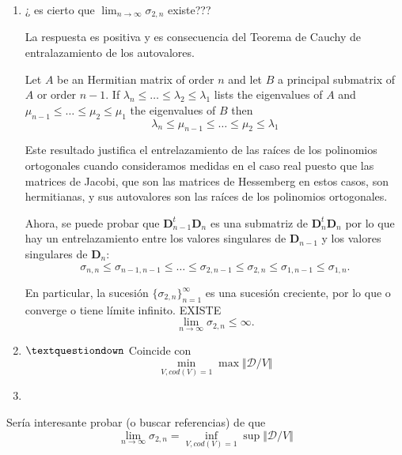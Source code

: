 \documentclass[12pt,a4paper]{article}
\begin{document}
\begin{enumerate} 
\item ¿ es cierto que $\lim_{n\to \infty} \sigma_{2,n}$ existe??? 

\noindent La respuesta es positiva y es consecuencia del Teorema de Cauchy de entralazamiento de los autovalores. 

 Let $A$ be an Hermitian matrix of order $n$ and let $B$ a principal submatrix of $A$ or order $n-1$. If $\lambda_n\leq \dots \leq \lambda_2\leq \lambda_1$ lists the eigenvalues of $A$ and $\mu_{n-1}\leq \dots \leq \mu_2\leq \mu_1$ the eigenvalues of $B$ then 
$$
\lambda_n \leq \mu_{n-1} \leq \dots \leq \mu_2 \leq \lambda_1
$$

\noindent Este resultado justifica el entrelazamiento de las raíces de los polinomios ortogonales cuando consideramos medidas en el caso real puesto que las  matrices de Jacobi, que son las matrices de Hessemberg en estos casos, son hermitianas, y sus autovalores son las raíces de los polinomios ortogonales. 

\noindent Ahora, se puede probar que 
 $\mathbf{D}^{t}_{n-1}\mathbf{D}_n$ es una submatriz de $\mathbf{D}_n^{t}\mathbf{D}_n$ 
por lo que hay un entrelazamiento entre los valores singulares de $\mathbf{D}_{n-1}$ y los valores singulares de $\mathbf{D}_n$: 
$$
\sigma_{n,n} \leq \sigma_{n-1,n-1} \leq \dots \leq \sigma_{2,n-1} \leq   \sigma_{2,n} \leq \sigma_{1,n-1} \leq \sigma_{1,n}.
$$

\noindent En particular, la sucesi\'on $\{\sigma_{2,n}\}_{n=1}^{\infty}$ es una sucesi\'on creciente, por lo que o converge o tiene límite infinito. EXISTE 
$$
\lim_{n\to \infty} \sigma_{2,n} \leq \infty.
$$
\item $\textquestiondown $ Coincide con 
$$
\min_{V, cod(V)=1} \max \Vert \mathcal{D}/V \Vert 
$$
\noindent 

\item 
\end{enumerate} 

\noindent Sería interesante probar (o buscar referencias) de que 
$$
\lim_{n\to \infty} \sigma_{2,n} = \inf_{V, cod(V)=1} \sup \Vert \mathcal{D}/V \Vert 
$$
\end{document}
